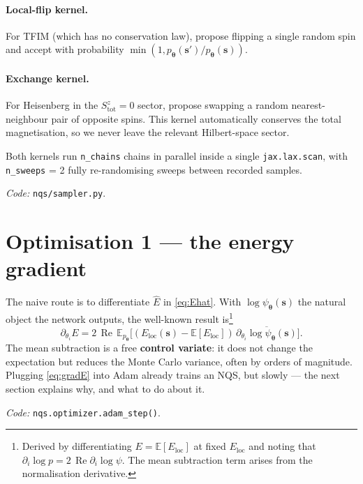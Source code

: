 \documentclass[11pt,a4paper]{article}
\newcommand{\E}{\mathbb{E}}
\newcommand{\bs}{\bm{s}}
\newcommand{\btheta}{\bm{\theta}}
\newcommand{\psip}{\psi_{\btheta}}
\newcommand{\Eloc}{E_{\mathrm{loc}}}
\DeclareMathOperator{\Real}{Re}
\theoremstyle{definition}
\theoremstyle{plain}
\begin{document}
\paragraph{Local-flip kernel.} For TFIM (which has no conservation law),
propose flipping a single random spin and accept with probability
$\min(1, p_{\btheta}(\bs')/p_{\btheta}(\bs))$.

\paragraph{Exchange kernel.} For Heisenberg in the
$S^{z}_{\text{tot}}\!=\!0$ sector, propose swapping a random
nearest-neighbour pair of opposite spins. This kernel automatically conserves
the total magnetisation, so we never leave the relevant Hilbert-space sector.

Both kernels run \texttt{n\_chains} chains in parallel inside a
single \texttt{jax.lax.scan}, with \texttt{n\_sweeps} = 2 fully
re-randomising sweeps between recorded samples.

\smallskip
\noindent\textit{Code:} \texttt{nqs/sampler.py}.

\section{Optimisation 1 — the energy gradient}

The naive route is to differentiate $\widehat{E}$ in
\eqref{eq:Ehat}. With $\log\psip(\bs)$ the natural object the network outputs,
the well-known result is\footnote{%
Derived by differentiating $E = \mathbb{E}[\Eloc]$ at fixed $\Eloc$
and noting that $\partial_i \log p = 2\,\Real \partial_i \log\psi$.
The mean subtraction term arises from the normalisation derivative.}
\begin{equation}
   \partial_{\theta_{i}} E
   = 2\,\Real\,
     \E_{p_{\btheta}}
     \bigl[(\Eloc(\bs) - \E[\Eloc])\,
           \overline{\partial_{\theta_{i}}\log\psip(\bs)}\bigr].
\label{eq:gradE}
\end{equation}
The mean subtraction is a free \textbf{control variate}: it does not change
the expectation but reduces the Monte Carlo variance, often by orders of
magnitude. Plugging \eqref{eq:gradE} into Adam already trains an NQS, but
slowly --- the next section explains why, and what to do about it.

\smallskip
\noindent\textit{Code:} \texttt{nqs.optimizer.adam\_step()}.
\end{document}
